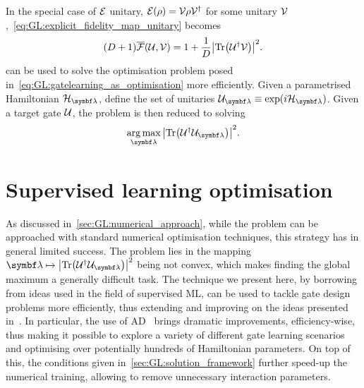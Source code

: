 In the special case of ${\mathcal{E}}$ unitary, ${\mathcal{E}}(\rho)={\mathcal{V}}\rho {\mathcal{V}}^\dagger$ for some unitary ${\mathcal{V}}$,~\cref{eq:GL:explicit_fidelity_map_unitary} becomes
\begin{equation}
    (D+1) \overline{{\mathcal{F}}}({\mathcal{U}}, {\mathcal{V}}) =
    1 + \frac{1}{D} \abs{\Tr({\mathcal{U}}^\dagger {\mathcal{V}})}^2.
    \label{eq:GL:explicit_fidelity_unitary_unitary}
\end{equation}
 can be used to solve the optimisation problem posed in~\cref{eq:GL:gatelearning_as_optimisation} more efficiently.
Given a parametrised Hamiltonian $\calH_{\bslambda}$, define the set of unitaries $\calU_{\bslambda}\equiv\exponential(i\calH_{\bslambda})$. Given a target gate ${\mathcal{U}}$, the problem is then reduced to solving
\begin{equation}
    \argmax_{\bslambda} \abs{\Tr(\calU^\dagger \calU_{\bslambda})}^2.
\end{equation}



\section{Supervised learning optimisation}
\label{sec:GL:supervised_learning}

As discussed in~\cref{sec:GL:numerical_approach}, while the problem can be approached with standard numerical optimisation techniques, this strategy has in general limited success.
The problem lies in the mapping $\bslambda\mapsto\abs{\Tr(\calU^\dagger \calU_{\bslambda})}^2$ being not convex, which makes finding the global maximum a generally difficult task.
The technique we present here, by borrowing from ideas used in the field of supervised ML, can be used  to tackle gate design problems more efficiently, thus extending and improving on the ideas presented in~\cite{banchi2016quantum}.
In particular, the use of \ac{AD}~\cite{baydin2018automatic,bartholomewbiggs2000automatic,wengert1964a,bischof2008advances} brings dramatic improvements, efficiency-wise, thus making it possible to explore a variety of different gate learning scenarios and optimising over potentially hundreds of Hamiltonian parameters.
On top of this, the conditions given in~\cref{sec:GL:solution_framework} further speed-up the numerical training, allowing to remove unnecessary interaction parameters.

